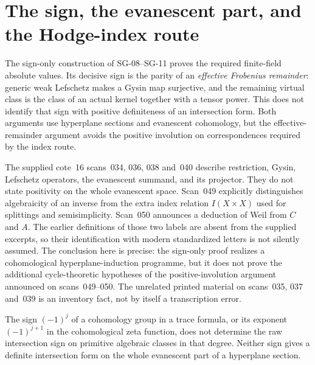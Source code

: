\section{The sign, the evanescent part, and the Hodge-index route}

The sign-only construction of SG-08--SG-11 proves the required finite-field absolute values. Its decisive sign is the parity of an \emph{effective Frobenius remainder}: generic weak Lefschetz makes a Gysin map surjective, and the remaining virtual class is the class of an actual kernel together with a tensor power. This does not identify that sign with positive definiteness of an intersection form. Both arguments use hyperplane sections and evanescent cohomology, but the effective-remainder argument avoids the positive involution on correspondences required by the index route.

The supplied cote~16 scans~034, 036, 038 and~040 describe restriction, Gysin, Lefschetz operators, the evanescent summand, and its projector. They do not state positivity on the whole evanescent space. Scan~049 explicitly distinguishes algebraicity of an inverse from the extra index relation $I(X\times X)$ used for splittings and semisimplicity. Scan~050 announces a deduction of Weil from $C$ and $A$. The earlier definitions of those two labels are absent from the supplied excerpts, so their identification with modern standardized letters is not silently assumed. The conclusion here is precise: the sign-only proof realizes a cohomological hyperplane-induction programme, but it does not prove the additional cycle-theoretic hypotheses of the positive-involution argument announced on scans~049--050. The unrelated printed material on scans~035, 037 and~039 is an inventory fact, not by itself a transcription error.

\begin{proposition}
The sign $(-1)^j$ of a cohomology group in a trace formula, or its exponent $(-1)^{j+1}$ in the cohomological zeta function, does not determine the raw intersection sign on primitive algebraic classes in that degree. Neither sign gives a definite intersection form on the whole evanescent part of a hyperplane section.
\end{proposition}

